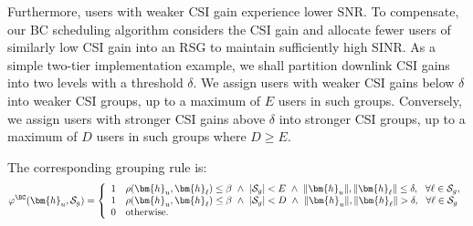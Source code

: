 Furthermore, users with weaker CSI gain experience lower SNR. To compensate, our BC scheduling algorithm considers the CSI gain and allocate fewer users of similarly low
CSI gain into an RSG to maintain sufficiently high SINR. 
As a simple two-tier implementation example, 
we shall partition downlink CSI gains into two levels with a threshold $\delta$.
We assign users with weaker CSI gains below $\delta$ into weaker CSI groups,
up to a maximum of $E$ users in such groups. Conversely, we assign users with stronger CSI gains above $\delta$ into stronger CSI groups, up to a maximum of $D$ users in such groups where $D\ge E.$

The corresponding grouping rule is:
\begin{align}
	\varphi^{\BC}(\bm{h}_u,\mathcal{S}_g)=\left\{\begin{array}{ll}1&
		\rho(\bm{h}_u,\bm{h}_{\ell})\leq\beta
		\,\,\wedge\,\,|\mathcal{S}_g|<E\,\,\wedge\,\,\|\bm{h}_u\|,\|\bm{h}_{\ell}\|\leq\delta,\,\,\,\,\forall \ell\in\mathcal{S}_g,\\
		1&
		\rho(\bm{h}_u,\bm{h}_{\ell})\leq\beta
		\,\,\wedge\,\,|\mathcal{S}_g|<D\,\,\wedge\,\,\|\bm{h}_u\|,\|\bm{h}_{\ell}\|>\delta,\,\,\,\,\forall \ell\in\mathcal{S}_g\\
		0&\text{otherwise.}\end{array}\right.
	\label{usch:eqn:assignment_rule_bc}
\end{align}

